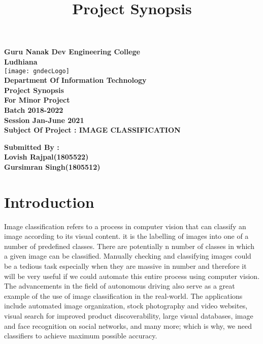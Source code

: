 \documentclass{article}
\title{Project Synopsis}
\begin{document}
\begin{center}
\textbf{{\huge Guru Nanak Dev Engineering College}}\\
\vspace{10 mm}
\textbf{{\huge Ludhiana}}\\

\texttt{[image: gndecLogo]}\\
\textbf{{\huge Department Of Information Technology}}\\
\vspace{10 mm}
\textbf{{\huge Project Synopsis}}\\
\vspace{8 mm}
\textbf{{\huge For Minor Project}}\\
\vspace{8 mm}
\textbf{{\huge Batch 2018-2022}}\\
\vspace{8 mm}
\textbf{{\huge Session Jan-June 2021}}\\
\vspace{8 mm}
\textbf{{\Large Subject Of Project : \Large IMAGE CLASSIFICATION}}\\
\vspace{7 mm}

\end{center}
\textbf{{\Large Submitted By :}}\\

\textbf{{\large Lovish Rajpal(1805522)}}\\

\textbf{{\large Gursimran Singh(1805512)}}\\

\vspace{7 mm}
\pagebreak

\tableofcontents

\maketitle

\section{Introduction}
Image classification refers to a process in computer vision that can classify an image according to its visual content.
 it is the labelling of images into one of a number of predefined classes. There are potentially n number of classes in which a given image can be classified. Manually checking and classifying images could be a tedious task especially when they are massive in number and therefore it will be very useful if we could automate this entire process using computer vision. The advancements in the field of autonomous driving also serve as a great example of the use of image classification in the real-world. The applications include automated image organization, stock photography and video websites, visual search for improved product discoverability, large visual databases, image and face recognition on social networks, and many more; which is why, we need classifiers to achieve maximum possible accuracy.\\
\end{document}
